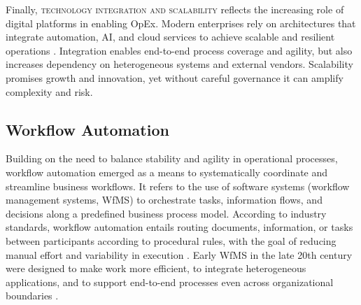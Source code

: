 Finally, \textsc{technology integration and scalability} reflects the increasing role of digital platforms in enabling OpEx. Modern enterprises rely on architectures that integrate automation, AI, and cloud services to achieve scalable and resilient operations \parencite{owoadeSystematic2024}. Integration enables end-to-end process coverage and agility, but also increases dependency on heterogeneous systems and external vendors. Scalability promises growth and innovation, yet without careful governance it can amplify complexity and risk.

\subsection{Workflow Automation}\label{subsec:workflow-auto}
Building on the need to balance stability and agility in operational processes, workflow automation emerged as a means to systematically coordinate and streamline business workflows. It refers to the use of software systems (workflow management systems, WfMS) to orchestrate tasks, information flows, and decisions along a predefined business process model. According to industry standards, workflow automation entails routing documents, information, or tasks between participants according to procedural rules, with the goal of reducing manual effort and variability in execution \parencite{basuResearch2002}. Early WfMS in the late 20th century were designed to make work more efficient, to integrate heterogeneous applications, and to support end-to-end processes even across organizational boundaries \parencite{stohrWorkflow2001}.


